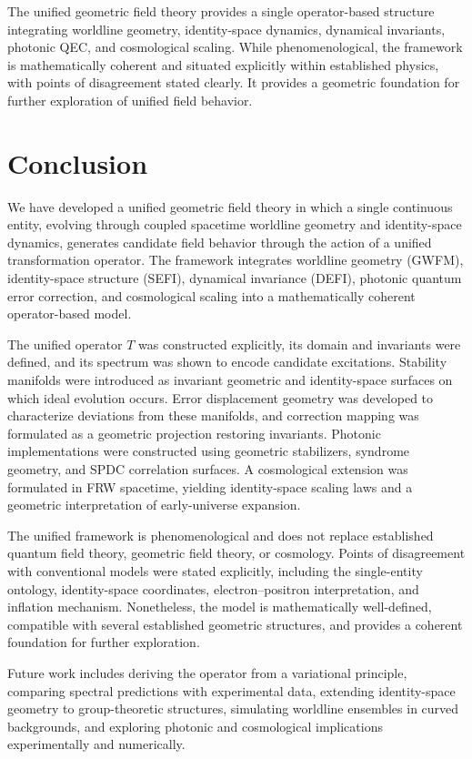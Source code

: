 \documentclass[aip,jmp,reprint,onecolumn,nofootinbib]{revtex4-2}
\begin{document}
The unified geometric field theory provides a single operator-based structure integrating 
worldline geometry, identity-space dynamics, dynamical invariants, photonic QEC, and 
cosmological scaling. While phenomenological, the framework is mathematically coherent 
and situated explicitly within established physics, with points of disagreement stated 
clearly. It provides a geometric foundation for further exploration of unified field behavior.
\section{Conclusion}

We have developed a unified geometric field theory in which a single continuous entity, 
evolving through coupled spacetime worldline geometry and identity-space dynamics, 
generates candidate field behavior through the action of a unified transformation operator. 
The framework integrates worldline geometry (GWFM), identity-space structure (SEFI), 
dynamical invariance (DEFI), photonic quantum error correction, and cosmological scaling 
into a mathematically coherent operator-based model.

The unified operator $T$ was constructed explicitly, its domain and invariants were defined, 
and its spectrum was shown to encode candidate excitations. Stability manifolds were 
introduced as invariant geometric and identity-space surfaces on which ideal evolution 
occurs. Error displacement geometry was developed to characterize deviations from these 
manifolds, and correction mapping was formulated as a geometric projection restoring 
invariants. Photonic implementations were constructed using geometric stabilizers, syndrome 
geometry, and SPDC correlation surfaces. A cosmological extension was formulated in FRW 
spacetime, yielding identity-space scaling laws and a geometric interpretation of early-universe 
expansion.

The unified framework is phenomenological and does not replace established quantum field 
theory, geometric field theory, or cosmology. Points of disagreement with conventional 
models were stated explicitly, including the single-entity ontology, identity-space coordinates, 
electron–positron interpretation, and inflation mechanism. Nonetheless, the model is 
mathematically well-defined, compatible with several established geometric structures, and 
provides a coherent foundation for further exploration.

Future work includes deriving the operator from a variational principle, comparing spectral 
predictions with experimental data, extending identity-space geometry to group-theoretic 
structures, simulating worldline ensembles in curved backgrounds, and exploring photonic 
and cosmological implications experimentally and numerically.
\end{document}
